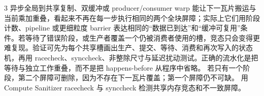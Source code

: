 \begin{solutionexercise}{3}
异步全局到共享复制、双缓冲或 producer/consumer warp 能让下一瓦片搬运与当前乘加重叠，看起来不再在每一步执行相同的两个全块屏障；实际上它们用阶段计数、pipeline 或更细粒度 barrier 表达相同的“数据已到达”和“缓冲可复用”条件。若等待了错误阶段，或生产者覆盖一个仍被消费者使用的槽，竞态只会变得更难复现。验证可先为每个共享槽画出生产、提交、等待、消费和再次写入的状态机，再用 racecheck、synccheck、非整除尺寸与延迟扰动测试。正确的流水化是把等待与独立工作重叠，而不是把 happens-before 从程序中省略。
\variantheading 若只有一个阶段，第二个屏障可删除，因为不存在下一瓦片覆盖；第一个屏障仍不可缺。
\practiceheading 用 Compute Sanitizer racecheck 与 synccheck 检测共享内存竞态和不一致屏障。
\end{solutionexercise}

